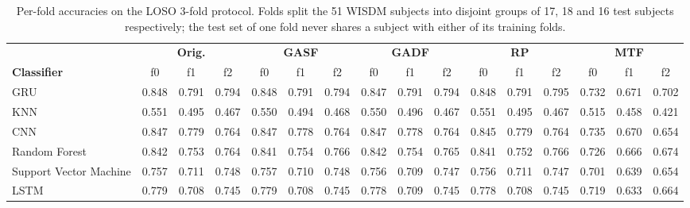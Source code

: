 \begin{table}[H]
\centering
\caption{Per-fold accuracies on the LOSO 3-fold protocol. Folds split the 51 WISDM subjects into disjoint groups of 17, 18 and 16 test subjects respectively; the test set of one fold never shares a subject with either of its training folds.}
\label{tab:gadf_summary_perfold_loso}
\setlength{\tabcolsep}{3pt}
\footnotesize
\begin{tabular}{l|ccc|ccc|ccc|ccc|ccc}
\toprule
 & \multicolumn{3}{c|}{\textbf{Orig.}} & \multicolumn{3}{c|}{\textbf{GASF}} & \multicolumn{3}{c|}{\textbf{GADF}} & \multicolumn{3}{c|}{\textbf{RP}} & \multicolumn{3}{c}{\textbf{MTF}} \\
\textbf{Classifier} & f0 & f1 & f2 & f0 & f1 & f2 & f0 & f1 & f2 & f0 & f1 & f2 & f0 & f1 & f2 \\
\midrule
GRU & 0.848 & 0.791 & 0.794 & 0.848 & 0.791 & 0.794 & 0.847 & 0.791 & 0.794 & 0.848 & 0.791 & 0.795 & 0.732 & 0.671 & 0.702 \\
KNN & 0.551 & 0.495 & 0.467 & 0.550 & 0.494 & 0.468 & 0.550 & 0.496 & 0.467 & 0.551 & 0.495 & 0.467 & 0.515 & 0.458 & 0.421 \\
CNN & 0.847 & 0.779 & 0.764 & 0.847 & 0.778 & 0.764 & 0.847 & 0.778 & 0.764 & 0.845 & 0.779 & 0.764 & 0.735 & 0.670 & 0.654 \\
Random Forest & 0.842 & 0.753 & 0.764 & 0.841 & 0.754 & 0.766 & 0.842 & 0.754 & 0.765 & 0.841 & 0.752 & 0.766 & 0.726 & 0.666 & 0.674 \\
Support Vector Machine & 0.757 & 0.711 & 0.748 & 0.757 & 0.710 & 0.748 & 0.756 & 0.709 & 0.747 & 0.756 & 0.711 & 0.747 & 0.701 & 0.639 & 0.654 \\
LSTM & 0.779 & 0.708 & 0.745 & 0.779 & 0.708 & 0.745 & 0.778 & 0.709 & 0.745 & 0.778 & 0.708 & 0.745 & 0.719 & 0.633 & 0.664 \\
\bottomrule
\end{tabular}
\end{table}


